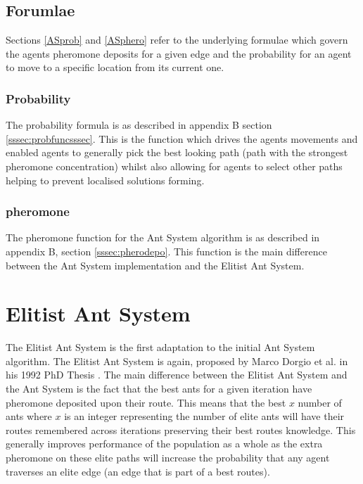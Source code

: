 \subsection{Forumlae}

Sections \ref{ASprob} and \ref{ASphero} refer to the underlying formulae which govern the agents pheromone deposits for a given edge and the probability for an agent to move to a specific location from its current one.

\subsubsection{Probability}

The probability formula is as described in appendix B section \ref{sssec:probfuncsssec}. This is the function which drives the agents movements and enabled agents to generally pick the best looking path (path with the strongest pheromone concentration) whilst also allowing for agents to select other paths helping to prevent localised solutions forming.

\label{ASprob}

\subsubsection{pheromone}

The pheromone function for the Ant System algorithm is as described in appendix B, section \ref{sssec:pherodepo}. This function is the main difference between the Ant System implementation and the Elitist Ant System.

\label{ASphero}

\section{Elitist Ant System}
\label{eliteymcneaty}
The Elitist Ant System is the first adaptation to the initial Ant System algorithm. The Elitist Ant System is again, proposed by Marco Dorgio et al. in his 1992 PhD Thesis \cite{Dor1992:thesis}. The main difference between the Elitist Ant System and the Ant System is the fact that the best ants for a given iteration have pheromone deposited upon their route. This means that the best $x$ number of ants where $x$ is an integer representing the number of elite ants will have their routes remembered across iterations preserving their best routes knowledge. This generally improves performance of the population as a whole as the extra pheromone on these elite paths will increase the probability that any agent traverses an elite edge (an edge that is part of a best routes).

